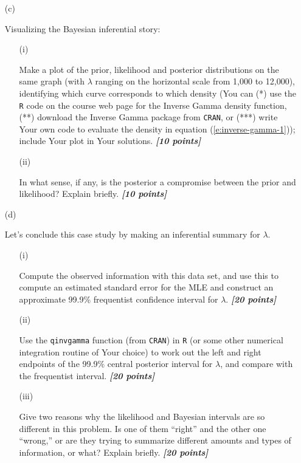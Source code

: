 \documentclass[12pt]{article}
\newcommand{\bi}[1]{\b{\i{#1}}}
\renewcommand{\b}[1]{\textbf{#1}}
\renewcommand{\i}[1]{\textit{#1}}
\renewcommand{\t}[1]{\texttt{#1}}
\begin{document}
\begin{itemize}
\begin{itemize}
\begin{itemize}
\begin{table}[t!]
\end{table}

\bigskip

\item[(c)] 

Visualizing the Bayesian inferential story:

\begin{itemize}

\item[(i)]

Make a plot of the prior, likelihood and posterior distributions on the same graph (with $\lambda$ ranging on the horizontal scale from 1,000 to 12,000), identifying which curve corresponds to which density (You can (*) use the \texttt{R} code on the course web page for the Inverse Gamma density function, (**) download the Inverse Gamma package from \t{CRAN}, or (***) write Your own code to evaluate the density in equation (\ref{e:inverse-gamma-1})); include Your plot in Your solutions. \bi{[10 points]}

\item[(ii)]

In what sense, if any, is the posterior a compromise between the prior and likelihood? Explain briefly. \bi{[10 points]}

\end{itemize}

\item[(d)] 

Let's conclude this case study by making an inferential summary for $\lambda$.

\begin{itemize}

\item[(i)]

Compute the observed information with this data set, and use this to compute an estimated standard error for the MLE and construct an approximate 99.9\% frequentist confidence interval for $\lambda$. \bi{[20 points]}

\item[(ii)]

Use the \texttt{qinvgamma} function (from \texttt{CRAN}) in \texttt{R} (or some other numerical integration routine of Your choice) to work out the left and right endpoints of the 99.9\% central posterior interval for $\lambda$, and compare with the frequentist interval. \bi{[20 points]}

\item[(iii)]

Give two reasons why the likelihood and Bayesian intervals are so different in this problem. Is one of them ``right'' and the other one ``wrong,'' or are they trying to summarize different amounts and types of information, or what? Explain briefly. \bi{[20 points]}


\end{itemize}
\end{itemize}
\end{itemize}
\end{itemize}
\end{document}
